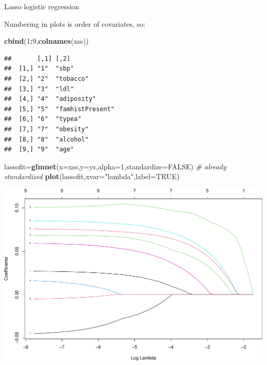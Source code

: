 \documentclass[
  ignorenonframetext,
]{beamer}
\newenvironment{Shaded}{\begin{snugshade}}{\end{snugshade}}
\newcommand{\CommentTok}[1]{\textcolor[rgb]{0.56,0.35,0.01}{\textit{#1}}}
\newcommand{\DataTypeTok}[1]{\textcolor[rgb]{0.13,0.29,0.53}{#1}}
\newcommand{\DecValTok}[1]{\textcolor[rgb]{0.00,0.00,0.81}{#1}}
\newcommand{\KeywordTok}[1]{\textcolor[rgb]{0.13,0.29,0.53}{\textbf{#1}}}
\newcommand{\NormalTok}[1]{#1}
\newcommand{\OperatorTok}[1]{\textcolor[rgb]{0.81,0.36,0.00}{\textbf{#1}}}
\newcommand{\OtherTok}[1]{\textcolor[rgb]{0.56,0.35,0.01}{#1}}
\newcommand{\StringTok}[1]{\textcolor[rgb]{0.31,0.60,0.02}{#1}}
\begin{document}
\begin{frame}[fragile]

\begin{block}{Lasso logistic regression}

Numbering in plots is order of covariates, so:

\begin{Shaded}
\begin{Highlighting}[]
\KeywordTok{cbind}\NormalTok{(}\DecValTok{1}\OperatorTok{:}\DecValTok{9}\NormalTok{,}\KeywordTok{colnames}\NormalTok{(xss))}
\end{Highlighting}
\end{Shaded}

\begin{verbatim}
##       [,1] [,2]            
##  [1,] "1"  "sbp"           
##  [2,] "2"  "tobacco"       
##  [3,] "3"  "ldl"           
##  [4,] "4"  "adiposity"     
##  [5,] "5"  "famhistPresent"
##  [6,] "6"  "typea"         
##  [7,] "7"  "obesity"       
##  [8,] "8"  "alcohol"       
##  [9,] "9"  "age"
\end{verbatim}

\begin{Shaded}
\begin{Highlighting}[]
\NormalTok{lassofit=}\KeywordTok{glmnet}\NormalTok{(}\DataTypeTok{x=}\NormalTok{xss,}\DataTypeTok{y=}\NormalTok{ys,}\DataTypeTok{alpha=}\DecValTok{1}\NormalTok{,}\DataTypeTok{standardize=}\OtherTok{FALSE}\NormalTok{) }\CommentTok{# already standardized}
\KeywordTok{plot}\NormalTok{(lassofit,}\DataTypeTok{xvar=}\StringTok{"lambda"}\NormalTok{,}\DataTypeTok{label=}\OtherTok{TRUE}\NormalTok{)}
\end{Highlighting}
\end{Shaded}

\includegraphics{L3_files/figure-beamer/unnamed-chunk-8-1.pdf}


\end{block}
\end{frame}
\end{document}
